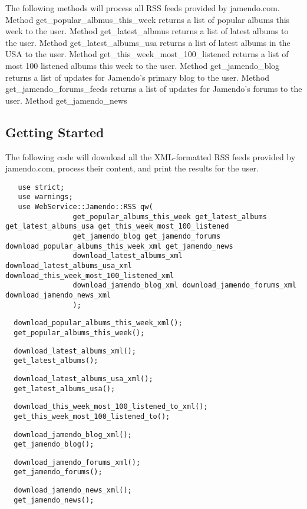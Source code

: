 The following methods will process all RSS feeds provided by jamendo.com.
Method get\_popular\_albmus\_this\_week returns a list of popular albums this week to the user.
Method get\_latest\_albmus returns a list of latest albums to the user.
Method get\_latest\_albums\_usa returns a list of latest albums in the USA to the user.
Method get\_this\_week\_most\_100\_listened returns a list of most 100 listened albums this week to the user.
Method get\_jamendo\_blog returns a list of updates for Jamendo's primary blog to the user.
Method get\_jamendo\_forums\_feeds returns a list of updates for Jamendo's forums to the user.
Method get\_jamendo\_news

\subsection*{Getting Started\label{Getting_Started}}


The following code will download all the XML-formatted RSS feeds provided by jamendo.com,
process their content, and print the results for the user.

\begin{verbatim}
   use strict;
   use warnings;
   use WebService::Jamendo::RSS qw(
                get_popular_albums_this_week get_latest_albums get_latest_albums_usa get_this_week_most_100_listened
                get_jamendo_blog get_jamendo_forums download_popular_albums_this_week_xml get_jamendo_news
                download_latest_albums_xml download_latest_albums_usa_xml download_this_week_most_100_listened_xml
                download_jamendo_blog_xml download_jamendo_forums_xml download_jamendo_news_xml
                );
\end{verbatim}
\begin{verbatim}
  download_popular_albums_this_week_xml();
  get_popular_albums_this_week();
\end{verbatim}
\begin{verbatim}
  download_latest_albums_xml();
  get_latest_albums();
\end{verbatim}
\begin{verbatim}
  download_latest_albums_usa_xml();
  get_latest_albums_usa();
\end{verbatim}
\begin{verbatim}
  download_this_week_most_100_listened_to_xml();
  get_this_week_most_100_listened_to();
\end{verbatim}
\begin{verbatim}
  download_jamendo_blog_xml();
  get_jamendo_blog();
\end{verbatim}
\begin{verbatim}
  download_jamendo_forums_xml();
  get_jamendo_forums();
\end{verbatim}
\begin{verbatim}
  download_jamendo_news_xml();
  get_jamendo_news();
\end{verbatim}
